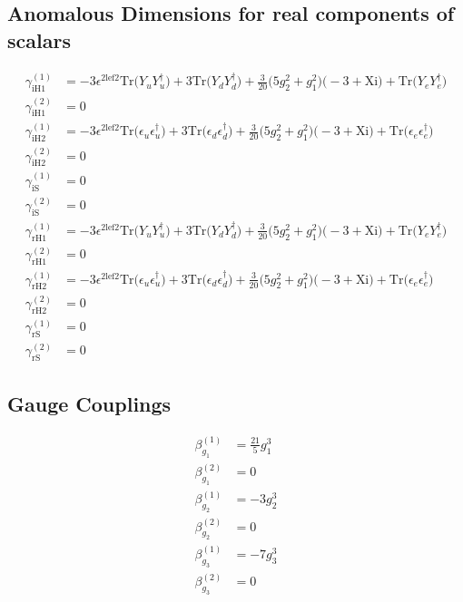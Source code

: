 \subsection{Anomalous Dimensions for real components of scalars}
{\allowdisplaybreaks \begin{align} 
\gamma_{\text{iH1}}^{(1)} & =  
-3 \epsilon^{{2 \text{lef2}}} \mbox{Tr}\Big({Y_u  Y_{u}^{\dagger}}\Big)  + 3 \mbox{Tr}\Big({Y_d  Y_{d}^{\dagger}}\Big)  + \frac{3}{20} \Big(5 g_{2}^{2}  + g_{1}^{2}\Big)\Big(-3 + \text{Xi}\Big) + \mbox{Tr}\Big({Y_e  Y_{e}^{\dagger}}\Big)\\ 
\gamma_{\text{iH1}}^{(2)} & =  
0\\ 
\gamma_{\text{iH2}}^{(1)} & =  
-3 \epsilon^{{2 \text{lef2}}} \mbox{Tr}\Big({\epsilon_u  \epsilon_{u}^{\dagger}}\Big)  + 3 \mbox{Tr}\Big({\epsilon_d  \epsilon_{d}^{\dagger}}\Big)  + \frac{3}{20} \Big(5 g_{2}^{2}  + g_{1}^{2}\Big)\Big(-3 + \text{Xi}\Big) + \mbox{Tr}\Big({\epsilon_e  \epsilon_{e}^{\dagger}}\Big)\\ 
\gamma_{\text{iH2}}^{(2)} & =  
0\\ 
\gamma_{\text{iS}}^{(1)} & =  
0\\ 
\gamma_{\text{iS}}^{(2)} & =  
0\\ 
\gamma_{\text{rH1}}^{(1)} & =  
-3 \epsilon^{{2 \text{lef2}}} \mbox{Tr}\Big({Y_u  Y_{u}^{\dagger}}\Big)  + 3 \mbox{Tr}\Big({Y_d  Y_{d}^{\dagger}}\Big)  + \frac{3}{20} \Big(5 g_{2}^{2}  + g_{1}^{2}\Big)\Big(-3 + \text{Xi}\Big) + \mbox{Tr}\Big({Y_e  Y_{e}^{\dagger}}\Big)\\ 
\gamma_{\text{rH1}}^{(2)} & =  
0\\ 
\gamma_{\text{rH2}}^{(1)} & =  
-3 \epsilon^{{2 \text{lef2}}} \mbox{Tr}\Big({\epsilon_u  \epsilon_{u}^{\dagger}}\Big)  + 3 \mbox{Tr}\Big({\epsilon_d  \epsilon_{d}^{\dagger}}\Big)  + \frac{3}{20} \Big(5 g_{2}^{2}  + g_{1}^{2}\Big)\Big(-3 + \text{Xi}\Big) + \mbox{Tr}\Big({\epsilon_e  \epsilon_{e}^{\dagger}}\Big)\\ 
\gamma_{\text{rH2}}^{(2)} & =  
0\\ 
\gamma_{\text{rS}}^{(1)} & =  
0\\ 
\gamma_{\text{rS}}^{(2)} & =  
0
\end{align} } 
\subsection{Gauge Couplings}
{\allowdisplaybreaks  \begin{align} 
\beta_{g_1}^{(1)} & =  
\frac{21}{5} g_{1}^{3} \\ 
\beta_{g_1}^{(2)} & =  
0\\ 
\beta_{g_2}^{(1)} & =  
-3 g_{2}^{3} \\ 
\beta_{g_2}^{(2)} & =  
0\\ 
\beta_{g_3}^{(1)} & =  
-7 g_{3}^{3} \\ 
\beta_{g_3}^{(2)} & =  
0
\end{align}} 
